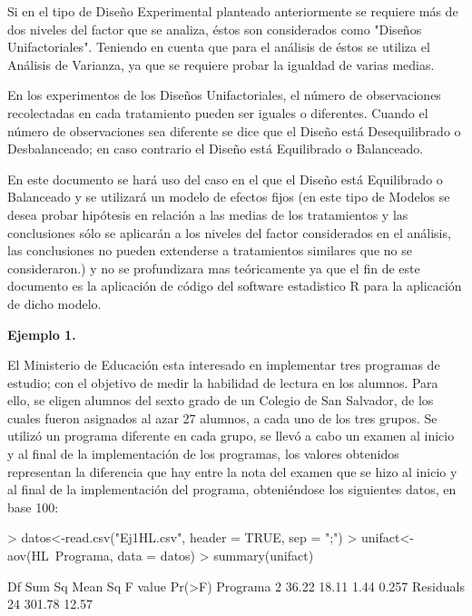 \documentclass[12pt,letterpaper]{report}
\begin{document}
Si en el tipo de Diseño Experimental planteado anteriormente se requiere más de dos
niveles del factor que se analiza, éstos son considerados como "Diseños Unifactoriales".
Teniendo en cuenta que para el análisis de éstos se utiliza el Análisis de Varianza, ya que se
requiere probar la igualdad de varias medias.

En los experimentos de los Diseños Unifactoriales, el número de observaciones
recolectadas en cada tratamiento pueden ser iguales o diferentes. Cuando el número de
observaciones sea diferente se dice que el Diseño está Desequilibrado o Desbalanceado; en
caso contrario el Diseño está Equilibrado o Balanceado.

En este documento se hará uso del caso en el que el Diseño está Equilibrado o Balanceado y se utilizará un modelo de efectos fijos (en este tipo
de Modelos se desea probar hipótesis en relación a las medias de los tratamientos y las
conclusiones sólo se aplicarán a los niveles del factor considerados en el análisis, las
conclusiones no pueden extenderse a tratamientos similares que no se consideraron.) y no se profundizara mas teóricamente ya que el fin de este documento es la aplicación de código del software estadistico R para la aplicación de dicho modelo.

\textbf{Ejemplo 1.}

El Ministerio de Educación esta interesado en implementar tres programas de estudio; con el
objetivo de medir la habilidad de lectura en los alumnos. Para ello, se eligen alumnos del sexto
grado de un Colegio de San Salvador, de los cuales fueron asignados al azar 27 alumnos, a
cada uno de los tres grupos. Se utilizó un programa diferente en cada grupo, se llevó a cabo un
examen al inicio y al final de la implementación de los programas, los valores obtenidos
representan la diferencia que hay entre la nota del examen que se hizo al inicio y al final de la
implementación del programa, obteniéndose los siguientes datos, en base 100:

\begin{Schunk}
\begin{Sinput}
> datos<-read.csv("Ej1HL.csv", header = TRUE, sep = ";")
> unifact<- aov(HL~Programa, data = datos)
> summary(unifact)
\end{Sinput}
\begin{Soutput}
            Df Sum Sq Mean Sq F value Pr(>F)
Programa     2  36.22   18.11    1.44  0.257
Residuals   24 301.78   12.57               
\end{Soutput}
\end{Schunk}
\end{document}
